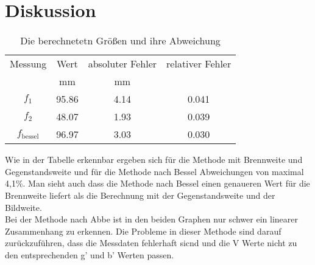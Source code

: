 \section{Diskussion}
\label{sec:Diskussion}
\begin{table}[H]
    \centering
    \begin{tabular}{c | c c c }
        \toprule
        Messung & Wert &  absoluter Fehler & relativer Fehler\\
         & mm & mm & \\
        \midrule
        $f_1$ & 95.86 & 4.14 & 0.041\\
        $f_2$ & 48.07 & 1.93 & 0.039\\
        $f_{\text{bessel}} $& 96.97 & 3.03 & 0.030\\
        \bottomrule
    \end{tabular}
    \caption{Die berechnetetn Größen und ihre Abweichung}
    \label{tab:tab1}
\end{table}
Wie in der Tabelle erkennbar ergeben sich für die Methode mit Brennweite und Gegenstandsweite und für die Methode nach Bessel Abweichungen von maximal 4,1\%.
Man sieht auch dass die Methode nach Bessel einen genaueren Wert für die Brennweite liefert als die Berechnung mit der Gegenstandsweite und der Bildweite. \\
Bei der Methode nach Abbe ist in den beiden Graphen nur schwer ein linearer Zusammenhang zu erkennen.
Die Probleme in dieser Methode sind darauf zurückzuführen, dass die Messdaten fehlerhaft sicnd und die V Werte nicht zu den entsprechenden g' und b' Werten passen.